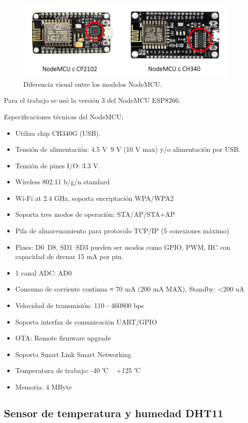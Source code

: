\begin{figure}[htbp]
	\centering
	\includegraphics[width=.85\textwidth]{./Figures/NodeMcu.jpg}
	\caption{Diferencia visual entre los modelos NodeMCU.}

	\label{fig:nodemcu}
\end{figure}

Para el trabajo se usó la versión 3 del NodeMCU ESP8266.

Especificaciones técnicas del NodeMCU:

\begin{itemize}
\item Utiliza chip CH340G (USB).
\item Tensión de alimentación: 4.5 V~9 V (10 V max) y/o alimentación por USB.
\item Tensión de pines I/O: 3.3 V.
\item Wireless 802.11 b/g/n standard
\item Wi-Fi at 2.4 GHz, soporta encriptación WPA/WPA2
\item Soporta tres modos de operación: STA/AP/STA+AP
\item Pila de almacenamiento para protocolo TCP/IP (5 conexiones máximo)
\item Pines: D0~D8, SD1~SD3 pueden ser usados como GPIO, PWM, IIC con capacidad de drenar 15 mA por pin.
\item 1 canal ADC: AD0
\item Consumo de corriente continua ≈ 70 mA (200 mA MAX), Standby: <200 uA
\item Velocidad de transmisión: 110 - 460800 bps
\item Soporta interfaz de comunicación UART/GPIO
\item OTA: Remote firmware upgrade
\item Soporta Smart Link Smart Networking
\item Temperatura de trabajo: -40 ℃ ~ +125 ℃
\item Memoria: 4 MByte
\end{itemize}

\subsection{Sensor de temperatura y humedad DHT11}

